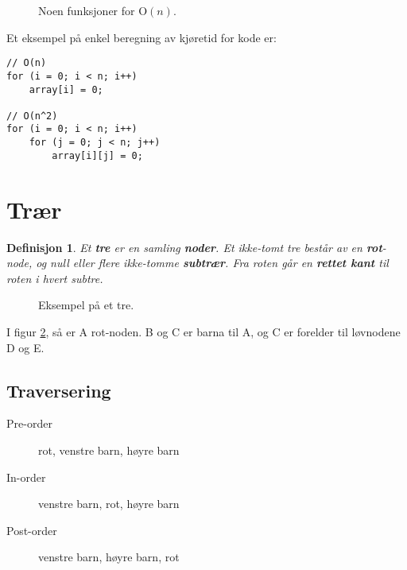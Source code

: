\documentclass[11pt,a4paper]{article}
\begin{document}
\begin{figure}[h!]
\centering
{}
\label{fig:ofunc}
\caption{Noen funksjoner for O$(n)$.}
\end{figure}

Et eksempel på enkel beregning av kjøretid for kode er:
\begin{lstlisting}
// O(n)
for (i = 0; i < n; i++)
	array[i] = 0;

// O(n^2)
for (i = 0; i < n; i++)
	for (j = 0; j < n; j++)
		array[i][j] = 0;
\end{lstlisting}


\section{Trær}
\newtheorem{tre}{Definisjon}[section]
\begin{tre}
Et \textbf{tre} er en samling \textbf{noder}. Et ikke-tomt tre består av en \textbf{rot}-node, og null eller flere ikke-tomme \textbf{subtrær}. Fra roten går en \textbf{rettet kant} til roten i hvert subtre.
\end{tre}

\begin{figure}[h!]
\centering
{}
\label{fig:basictree}
\caption{Eksempel på et tre.}
\end{figure}

I figur \ref{fig:basictree}, så er A rot-noden. B og C er barna til A, og C er forelder til løvnodene D og E.

\subsection{Traversering}
\begin{description}
\item[Pre-order] rot, venstre barn, høyre barn
\item[In-order] venstre barn, rot, høyre barn
\item[Post-order] venstre barn, høyre barn, rot
\end{description}
\end{document}

